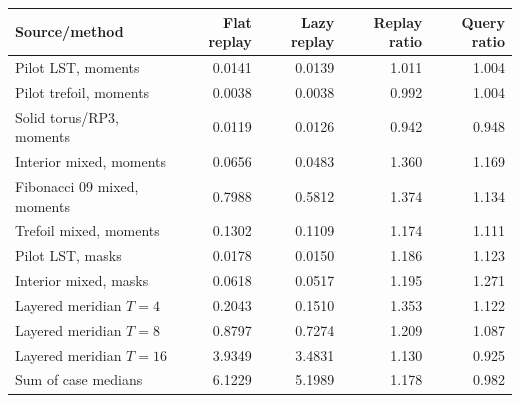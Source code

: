 \begin{tabular}{lrrrr}
\toprule
Source/method & Flat replay & Lazy replay & Replay ratio & Query ratio \\
\midrule
Pilot LST, moments & 0.0141 & 0.0139 & 1.011 & 1.004 \\
Pilot trefoil, moments & 0.0038 & 0.0038 & 0.992 & 1.004 \\
Solid torus/RP3, moments & 0.0119 & 0.0126 & 0.942 & 0.948 \\
Interior mixed, moments & 0.0656 & 0.0483 & 1.360 & 1.169 \\
Fibonacci 09 mixed, moments & 0.7988 & 0.5812 & 1.374 & 1.134 \\
Trefoil mixed, moments & 0.1302 & 0.1109 & 1.174 & 1.111 \\
Pilot LST, masks & 0.0178 & 0.0150 & 1.186 & 1.123 \\
Interior mixed, masks & 0.0618 & 0.0517 & 1.195 & 1.271 \\
Layered meridian $T=4$ & 0.2043 & 0.1510 & 1.353 & 1.122 \\
Layered meridian $T=8$ & 0.8797 & 0.7274 & 1.209 & 1.087 \\
Layered meridian $T=16$ & 3.9349 & 3.4831 & 1.130 & 0.925 \\
\midrule
Sum of case medians & 6.1229 & 5.1989 & 1.178 & 0.982 \\
\bottomrule
\end{tabular}
